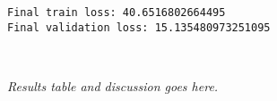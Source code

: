 \documentclass[11pt]{article}
\begin{document}
    \begin{Verbatim}[commandchars=\\\{\}]
Final train loss: 40.6516802664495
Final validation loss: 15.135480973251095

    \end{Verbatim}

    \begin{center}
    \end{center}
    { \hspace*{\fill} \\}
    
    \emph{Results table and discussion goes here.}


    
    
    
    
\end{document}
